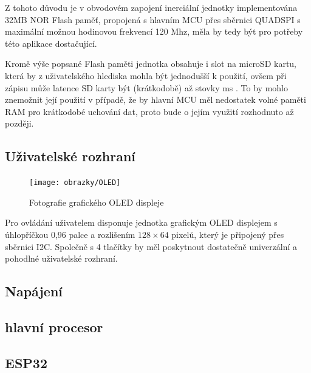Z tohoto důvodu je v obvodovém zapojení inerciální jednotky implementována 32MB NOR Flash paměť, propojená s hlavním MCU přes sběrnici QUADSPI s maximální možnou hodinovou frekvencí 120 Mhz, měla by tedy být pro potřeby této aplikace dostačující. \cite{CgaRYSTpwKhEZZr7}

Kromě výše popsané Flash paměti jednotka obsahuje i slot na microSD kartu, která by z uživatelského hlediska mohla být jednodušší k použití, ovšem při zápisu může latence SD karty být (krátkodobě) až stovky ms \cite{Kraewinkel2020}. To by mohlo znemožnit její použití v případě, že by hlavní MCU měl nedostatek volné paměti RAM pro krátkodobé uchování dat, proto bude o jejím využití rozhodnuto až později.

\subsection{Uživatelské rozhraní}
\begin{figure}[h]
    \centering
    \texttt{[image: obrazky/OLED]}
    \caption{Fotografie grafického OLED displeje}
\end{figure}
Pro ovládání uživatelem disponuje jednotka grafickým OLED displejem s úhlopříčkou 0,96 palce a rozlišením $ 128 \times 64 $ pixelů, který je připojený přes sběrnici I2C. Společně s 4 tlačítky by měl poskytnout dostatečně univerzální a pohodlné uživatelské rozhraní.

\subsection{Napájení}
\subsection{hlavní procesor}
\subsection{ESP32}




